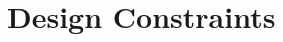 \documentclass{sig-alternate}
\begin{document}

\section{Design Constraints}
\label{sec:constraints}



\end{document}
